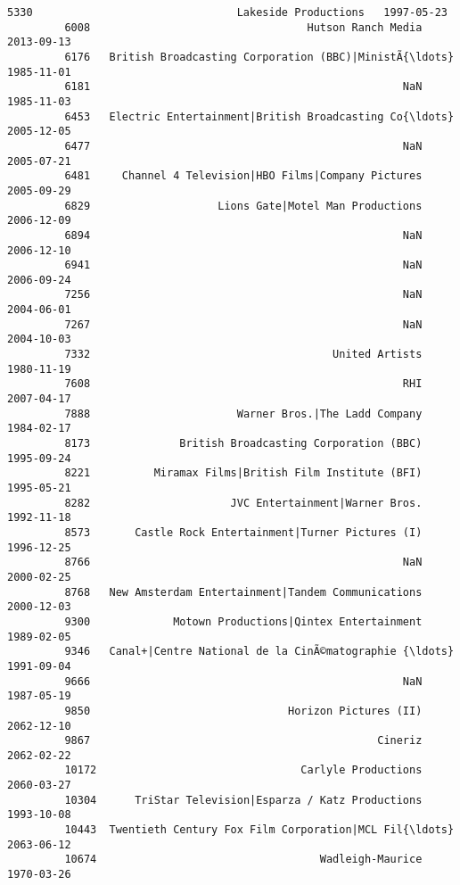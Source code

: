 \documentclass[11pt]{article}
\begin{document}
\begin{Verbatim}[commandchars=\\\{\}]
         5330                                Lakeside Productions   1997-05-23   
         6008                                  Hutson Ranch Media   2013-09-13   
         6176   British Broadcasting Corporation (BBC)|MinistÃ{\ldots}   1985-11-01   
         6181                                                 NaN   1985-11-03   
         6453   Electric Entertainment|British Broadcasting Co{\ldots}   2005-12-05   
         6477                                                 NaN   2005-07-21   
         6481     Channel 4 Television|HBO Films|Company Pictures   2005-09-29   
         6829                    Lions Gate|Motel Man Productions   2006-12-09   
         6894                                                 NaN   2006-12-10   
         6941                                                 NaN   2006-09-24   
         7256                                                 NaN   2004-06-01   
         7267                                                 NaN   2004-10-03   
         7332                                      United Artists   1980-11-19   
         7608                                                 RHI   2007-04-17   
         7888                       Warner Bros.|The Ladd Company   1984-02-17   
         8173              British Broadcasting Corporation (BBC)   1995-09-24   
         8221          Miramax Films|British Film Institute (BFI)   1995-05-21   
         8282                      JVC Entertainment|Warner Bros.   1992-11-18   
         8573       Castle Rock Entertainment|Turner Pictures (I)   1996-12-25   
         8766                                                 NaN   2000-02-25   
         8768   New Amsterdam Entertainment|Tandem Communications   2000-12-03   
         9300             Motown Productions|Qintex Entertainment   1989-02-05   
         9346   Canal+|Centre National de la CinÃ©matographie {\ldots}   1991-09-04   
         9666                                                 NaN   1987-05-19   
         9850                               Horizon Pictures (II)   2062-12-10   
         9867                                             Cineriz   2062-02-22   
         10172                                Carlyle Productions   2060-03-27   
         10304      TriStar Television|Esparza / Katz Productions   1993-10-08   
         10443  Twentieth Century Fox Film Corporation|MCL Fil{\ldots}   2063-06-12   
         10674                                   Wadleigh-Maurice   1970-03-26   
         

\end{Verbatim}
\end{document}
